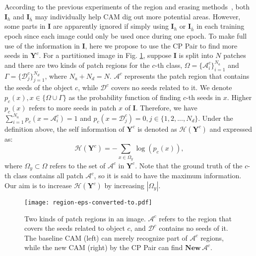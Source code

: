 \documentclass[10pt,twocolumn,letterpaper]{article}
\begin{document}
According to the previous experiments of the region and erasing methods~\cite{has,erase1}, both $\boldsymbol{I}_h$ and $\boldsymbol{I}_{\overline h}$ may individually help CAM dig out more potential areas. However, some parts in $\boldsymbol{I}$ are apparently ignored if simply using $\boldsymbol{I}_h$ or $\boldsymbol{I}_{\overline h}$ in each training epoch since each image could only be used once during one epoch. To make full use of the information in $\boldsymbol{I}$, here we propose to use the CP Pair to find more seeds in $\boldsymbol{Y}^c$.
For a partitioned image in Fig. \ref{fig:region}, suppose $\boldsymbol{I}$ is split into $N$ patches and there are two kinds of patch regions for the $c$-th class, $\Omega=\{\mathcal{A}^{c}_{i}\}_{i=1}^{N_a}$ and $\Gamma=\{\mathcal{D}^{c}_{j}\}_{j=1}^{N_d}$, where $N_a + N_d = N$. $\mathcal{A}^{c}$ represents the patch region that contains the seeds of the object $c$, while $\mathcal{D}^{c}$ covers no seeds related to it. We denote $p_{c}(x), x \in \{\Omega \cup \Gamma\}$ as the probability function of finding $c$-th seeds in $x$. Higher $p_{c}(x)$ refers to more seeds in patch $x$ of $\boldsymbol{I}$. Therefore, we have $\sum\nolimits_{i = 1}^{{N_{a}}} {{p_{c}}(x = {\mathcal{A}^{c}_{i}})}  = 1$ and $p_{c}(x=\mathcal{D}^{c}_{j})  = 0, j \in \{1,2,...,N_d\}$. Under the definition above, the self information of $\boldsymbol{Y}^{c}$ is denoted as $\mathcal{H}(\boldsymbol{Y}^{c})$ and expressed as:
\begin{equation}
\mathcal{H}(\boldsymbol{Y}^{c}) =  - \sum\limits_{x \in {\Omega}_y} \log ({p_{c}(x)}), \end{equation}
where ${\Omega}_y \subset {\Omega}$ refers to the set of $\mathcal{A}^{c}$ in $\boldsymbol{Y}^{c}$. Note that the ground truth of the $c$-th class contains all patch $\mathcal{A}^{c}$, so it is said to have the maximum information. Our aim is to increase $\mathcal{H}(\boldsymbol{Y}^{c}) $ by increasing $|{\Omega}_y|$.
\begin{figure}
\begin{center}
\texttt{[image: region-eps-converted-to.pdf]}
\end{center}
\vspace{-4mm}
   \caption{Two kinds of patch regions in an image. $\mathcal{A}^c$ refers to the region that covers the seeds related to object $c$, and $\mathcal{D}^c$ contains no seeds of it. The baseline CAM (left) can merely recognize part of $\mathcal{A}^c$ regions, while the new CAM (right) by the CP Pair can find $\boldsymbol{New}\, \mathcal{A}^c$.}
\label{fig:region}
\end{figure}
\end{document}
